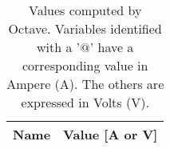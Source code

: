 
\begin{table}[h]
	\centering
	\begin{tabular}{|l|r|}
    		\hline    
    		{\bf Name} & {\bf Value [A or V]} \\ \hline
    		
  	\end{tabular}
  	\caption{Values computed by Octave. Variables identified with a '$@$' have a
  	corresponding value in Ampere (A). The others are expressed in Volts (V).}
 
\label{tab:oct}
\end{table}


